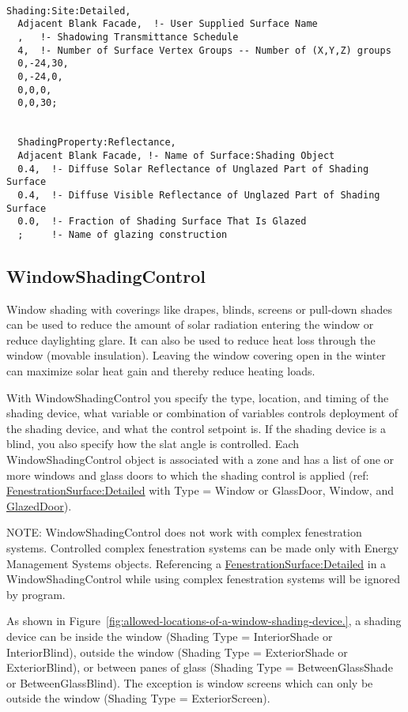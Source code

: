 \begin{lstlisting}

Shading:Site:Detailed,
  Adjacent Blank Facade,  !- User Supplied Surface Name
  ,   !- Shadowing Transmittance Schedule
  4,  !- Number of Surface Vertex Groups -- Number of (X,Y,Z) groups
  0,-24,30,
  0,-24,0,
  0,0,0,
  0,0,30;


  ShadingProperty:Reflectance,
  Adjacent Blank Facade, !- Name of Surface:Shading Object
  0.4,  !- Diffuse Solar Reflectance of Unglazed Part of Shading Surface
  0.4,  !- Diffuse Visible Reflectance of Unglazed Part of Shading Surface
  0.0,  !- Fraction of Shading Surface That Is Glazed
  ;     !- Name of glazing construction
\end{lstlisting}

\subsection{WindowShadingControl}\label{windowpropertyshadingcontrol}

Window shading with coverings like drapes, blinds, screens or pull-down shades can be used to reduce the amount of solar radiation entering the window or reduce daylighting glare. It can also be used to reduce heat loss through the window (movable insulation). Leaving the window covering open in the winter can maximize solar heat gain and thereby reduce heating loads.

With WindowShadingControl you specify the type,  location, and timing of the shading device, what variable or combination of variables controls deployment of the shading device, and what the control setpoint is. If the shading device is a blind, you also specify how the slat angle is controlled. Each WindowShadingControl object is associated with a zone and has a list of one or more windows and glass doors to which the shading control is applied (ref: \hyperref[fenestrationsurfacedetailed]{FenestrationSurface:Detailed} with Type = Window or GlassDoor, Window, and \hyperref[glazeddoor]{GlazedDoor}).

NOTE: WindowShadingControl does not work with complex fenestration systems. Controlled complex fenestration systems can be made only with Energy Management Systems objects. Referencing a \hyperref[fenestrationsurfacedetailed]{FenestrationSurface:Detailed} in a WindowShadingControl while using complex fenestration systems will be ignored by program.

As shown in Figure~\ref{fig:allowed-locations-of-a-window-shading-device.}, a shading device can be inside the window (Shading Type = InteriorShade or InteriorBlind), outside the window (Shading Type = ExteriorShade or ExteriorBlind), or between panes of glass (Shading Type = BetweenGlassShade or BetweenGlassBlind). The exception is window screens which can only be outside the window (Shading Type = ExteriorScreen).

